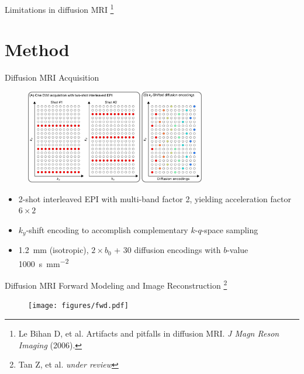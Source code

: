 \documentclass[hyperref={colorlinks=true,linkcolor=blue}, aspectratio=169]{beamer}
\begin{document}
\begin{frame}{Limitations in diffusion MRI \footnote{Le Bihan D, et al. Artifacts and pitfalls in diffusion MRI. \textit{J Magn Reson Imaging} (2006).}}
	\end{frame}

	\section{Method}

	\begin{frame}{Diffusion MRI Acquisition}
		\begin{figure}
			\centering
			\includegraphics[width=0.7\textwidth]{figures/diffusion_sampling.png}
		\end{figure}

		\begin{itemize}
			\item <1-> 2-shot interleaved EPI with multi-band factor 2, yielding acceleration factor $6 \times 2$
			\item <2-> $k_y$-shift encoding to accomplish complementary $k$-$q$-space sampling
			\item <3-> \SI{1.2}{mm} (isotropic), $2 \times b_0$ + 30 diffusion encodings with $b$-value \SI{1000}{\second\per\square\mm}
		\end{itemize}
	\end{frame}

	\begin{frame}{Diffusion MRI Forward Modeling and Image Reconstruction \footnote{Tan Z, et al. \textit{under review}}}
		\begin{figure}
			\centering
			\texttt{[image: figures/fwd.pdf]}
		\end{figure}
	\end{frame}
\end{document}
